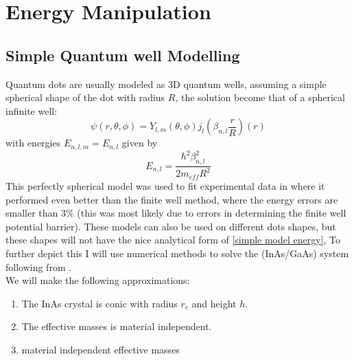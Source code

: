 \documentclass[twoside,11pt]{article}
\begin{document}
\section{Energy Manipulation}

    \subsection{Simple Quantum well Modelling}
    Quantum dots are usually modeled as 3D quantum wells, assuming a simple spherical shape of the dot with radius $R$, the solution become that of a spherical infinite well:
    \begin{equation}
        \mathcal{\psi}(r,\theta,\phi) = Y_{l,m}(\theta,\phi) j_l\left(\beta_{n, l}\frac{r}{R}\right)(r)
        \label{simple model}
    \end{equation}
    with energies $E_{n, l, m} = E_{n, l}$ given by
    \begin{equation}
        E_{n, l} = \frac{\hbar^2\beta_{n, l}^2}{2m_{eff}R^2}
        \label{simple model energy}
    \end{equation}
    This perfectly spherical model was used to fit experimental data in \cite{10.1063/1.3284083} where it performed even better than the finite well method, where the energy errors are smaller than $3\%$ (this was most likely due to errors in determining the finite well potential barrier). These models can also be used on different dots shapes, but these shapes will not have the nice analytical form of \ref{simple model energy}, To further depict this I will use numerical methods to solve the (InAs/GaAs) system following from \cite{marzin1994calculation}.\\
    We will make the following approximations:
    
    \begin{enumerate}
        \item The InAs crystal is conic with radius $r_c$ and height $h$.
        \item The effective masses is material independent.
        \item material independent effective masses
    \end{enumerate}
    
\end{document}
